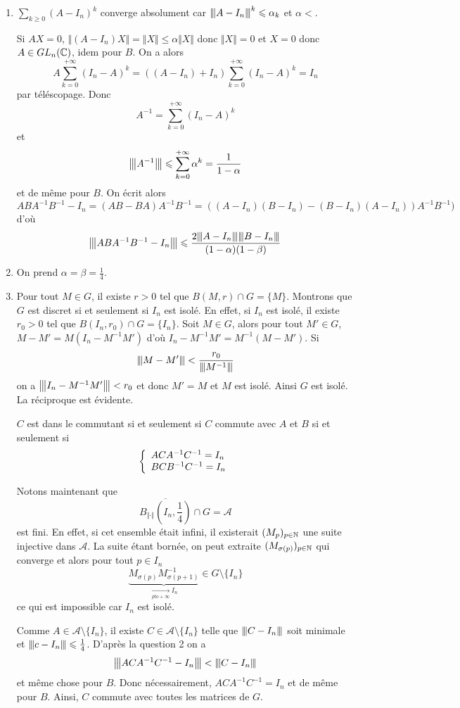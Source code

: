 \begin{solution}
	\phantom{}
	\begin{enumerate}
		\item $\sum_{k\geqslant0}(A-I_{n})^{k}$ converge absolument car $\vertiii{A-I_{n}}^{k}\leqslant\alpha_{k}$ et $\alpha<$.
		
		Si $AX=0$, $\Vert (A-I_{n})X\Vert=\Vert X\Vert\leqslant\alpha\Vert X\Vert$ donc $\Vert X\Vert=0$ et $X=0$ donc $A\in GL_{n}(\C)$, idem pour $B$. On a alors
		\begin{equation*}
			A\sum_{k=0}^{+\infty}(I_{n}-A)^{k}=((A-I_{n})+I_{n})\sum_{k=0}^{+\infty}(I_{n}-A)^{k}=I_{n}
		\end{equation*}
		par téléscopage. Donc 
		$$A^{-1}=\sum_{k=0}^{+\infty}(I_{n}-A)^{k}$$
		et
		$$\vertiii{A^{-1}}\leqslant\sum_{k=0}^{+\infty}\alpha^{k}=\frac{1}{1-\alpha}$$
		et de même pour $B$. On écrit alors
		$$ABA^{-1}B^{-1}-I_{n}=(AB-BA)A^{-1}B^{-1}=((A-I_{n})(B-I_{n})-(B-I_{n})(A-I_{n}))A^{-1}B^{-1})$$
		d'où
		$$\vertiii{ABA^{-1}B^{-1}-I_{n}}\leqslant\frac{2\vertiii{A-I_{n}}\vertiii{B-I_{n}}}{(1-\alpha)(1-\beta)}$$

		\item On prend $\alpha=\beta=\frac{1}{4}$.
		\item Pour tout $M\in G$, il existe $r>0$ tel que $B(M,r)\cap G=\{M\}$. Montrons que $G$ est discret si et seulement si $I_{n}$ est isolé. En effet, si $I_{n}$ est isolé, il existe $r_{0}>0$ tel que $B(I_{n},r_{0})\cap G=\{I_{n}\}$. Soit $M\in G$, alors pour tout $M'\in G$, $M-M'=M(I_{n}-M^{-1}M')$ d'où $I_{n}-M^{-1}M'=M^{-1}(M-M')$. Si 
		$$\vertiii{M-M'}<\frac{r_{0}}{\vertiii{M^{-1}}}$$
		on a $\vertiii{I_{n}-M^{-1}M'}<r_{0}$ et donc $M'=M$ et $M$ est isolé. Ainsi $G$ est isolé. La réciproque est évidente.

		$C$ est dans le commutant si et seulement si $C$ commute avec $A$ et $B$ si et seulement si
		$$
		\left\{
			\begin{array}[]{l}
				ACA^{-1}C^{-1}=I_{n}\\
				BCB^{-1}C^{-1}=I_{n}
			\end{array}
		\right.
		$$

		Notons maintenant que 
		$$\overline{B_{\Vert\cdot\Vert}(I_{n},\frac{1}{4})}\cap G=\mathcal{A}$$
		est fini. En effet, si cet ensemble était infini, il existerait $(M_{p})_{p\in\N}$ une suite injective dans $\mathcal{A}$. La suite étant bornée, on peut extraite $(M_{\sigma(p)})_{p\in\N}$ qui converge et alors pour tout $p\in I_{n}$
		$$\underbrace{M_{\sigma(p)}M_{\sigma(p+1)}^{-1}}_{\xrightarrow[pto+\infty]{}I_{n}}\in G\setminus\{I_{n}\}$$
		ce qui est impossible car $I_{n}$ est isolé.

		Comme $A\in \mathcal{A}\setminus\{I_{n}\}$, il existe $C\in\mathcal{A}\setminus\{I_{n}\}$ telle que $\vertiii{C-I_{n}}$ soit minimale et $\vertiii{c-I_{n}}\leqslant\frac{1}{4}$. D'après la question 2 on a 
		$$\vertiii{ACA^{-1}C^{-1}-I_{n}}<\vertiii{C-I_{n}}$$
		et même chose pour $B$. Donc nécessairement, $ACA^{-1}C^{-1}=I_{n}$ et de même pour $B$. Ainsi, $C$ commute avec toutes les matrices de $G$.
	\end{enumerate}
\end{solution}

